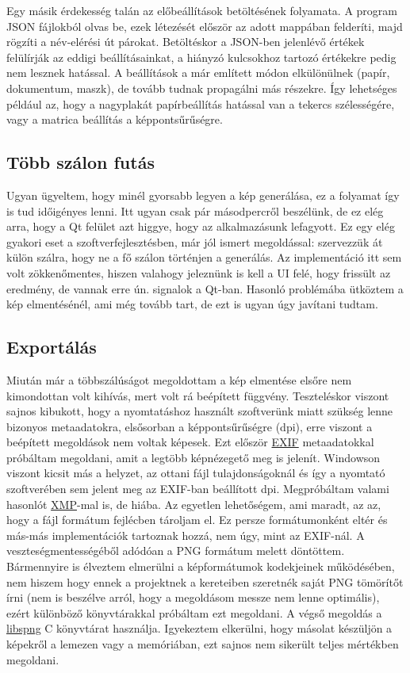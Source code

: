 Egy másik érdekesség talán az előbeállítások betöltésének folyamata. A program JSON fájlokból olvas be, ezek létezését először az adott mappában felderíti, majd rögzíti a név-elérési út párokat. Betöltéskor a JSON-ben jelenlévő értékek felülírják az eddigi beállításainkat, a hiányzó kulcsokhoz tartozó értékekre pedig nem lesznek hatással. A beállítások a már említett módon elkülönülnek (papír, dokumentum, maszk), de tovább tudnak propagálni más részekre. Így lehetséges például az, hogy a nagyplakát papírbeállítás hatással van a tekercs szélességére, vagy a matrica beállítás a képpontsűrűségre. 

\subsection{Több szálon futás}

Ugyan ügyeltem, hogy minél gyorsabb legyen a kép generálása, ez a folyamat így is tud időigényes lenni. Itt ugyan csak pár másodpercről beszélünk, de ez elég arra, hogy a Qt felület azt higgye, hogy az alkalmazásunk lefagyott. Ez egy elég gyakori eset a szoftverfejlesztésben, már jól ismert megoldással: szervezzük át külön szálra, hogy ne a fő szálon történjen a generálás. Az implementáció itt sem volt zökkenőmentes, hiszen valahogy jeleznünk is kell a UI felé, hogy frissült az eredmény, de vannak erre ún. signalok a Qt-ban. Hasonló problémába ütköztem a kép elmentésénél, ami még tovább tart, de ezt is ugyan úgy javítani tudtam. 

\subsection{Exportálás}

Miután már a többszálúságot megoldottam a kép elmentése elsőre nem kimondottan volt kihívás, mert volt rá beépített függvény. Teszteléskor viszont sajnos kibukott, hogy a nyomtatáshoz használt szoftverünk miatt szükség lenne bizonyos metaadatokra, elsősorban a képpontsűrűségre (dpi), erre viszont a beépített megoldások nem voltak képesek. Ezt először \href{https://en.wikipedia.org/wiki/Exif}{EXIF} metaadatokkal próbáltam megoldani, amit a legtöbb képnézegető meg is jelenít. Windowson viszont kicsit más a helyzet, az ottani fájl tulajdonságoknál és így a nyomtató szoftverében sem jelent meg az EXIF-ban beállított dpi. Megpróbáltam valami hasonlót \href{https://en.wikipedia.org/wiki/Extensible_Metadata_Platform}{XMP}-mal is, de hiába. Az egyetlen lehetőségem, ami maradt, az az, hogy a fájl formátum fejlécben tároljam el. Ez persze formátumonként eltér és más-más implementációk tartoznak hozzá, nem úgy, mint az EXIF-nál. A veszteségmentességéből adódóan a PNG formátum melett döntöttem. Bármennyire is élveztem elmerülni a képformátumok kodekjeinek működésében, nem hiszem hogy ennek a projektnek a kereteiben szeretnék saját PNG tömörítőt írni (nem is beszélve arról, hogy a megoldásom messze nem lenne optimális), ezért különböző könyvtárakkal próbáltam ezt megoldani. A végső megoldás a \href{https://libspng.org/}{libspng} C könyvtárat használja. Igyekeztem elkerülni, hogy másolat készüljön a képekről a lemezen vagy a memóriában, ezt sajnos nem sikerült teljes mértékben megoldani. 

